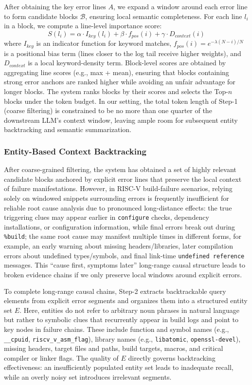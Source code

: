 \documentclass[sigconf]{acmart}
\begin{document}
After obtaining the key error lines $A$, we expand a window around each error line to form candidate blocks $\mathcal{B}$, ensuring local semantic completeness. For each line $l_i$ in a block, we compute a line-level importance score:
\begin{equation}
S(l_i) = \alpha \cdot I_{key}(l_i) + \beta \cdot f_{pos}(i) + \gamma \cdot D_{context}(i)
\end{equation}
where $I_{key}$ is an indicator function for keyword matches, $f_{pos}(i) = e^{-\lambda(N-i)/N}$ is a positional bias term (lines closer to the log tail receive higher weights), and $D_{context}$ is a local keyword-density term. Block-level scores are obtained by aggregating line scores (e.g., max + mean), ensuring that blocks containing strong error anchors are ranked higher while avoiding an unfair advantage for longer blocks. The system ranks blocks by their scores and selects the Top-$n$ blocks under the token budget. In our setting, the total token length of Step-1 (coarse filtering) is constrained to be no more than one quarter of the downstream LLM's context window, leaving ample room for subsequent entity backtracking and semantic summarization.

\subsubsection{Entity-Based Context Backtracking}

After coarse-grained filtering, the system has obtained a set of highly relevant candidate blocks anchored by explicit error lines that preserve the local context of failure manifestations. However, in RISC-V build-failure scenarios, relying solely on windowed snippets surrounding errors is frequently insufficient for reliable root cause analysis due to pronounced long-distance effects: the true triggering clues may appear earlier in \texttt{configure} checks, dependency installations, or configuration information, while final errors break out during \texttt{\%build}; the same root cause may manifest multiple times in different forms, for example, an early warning about missing headers/libraries, later compilation errors about undefined types/symbols, and final link-time \texttt{undefined reference} messages. This ``cause first, symptoms later'' long-range causal structure leads to broken evidence chains if we only preserve local windows around explicit errors.

To complete long-range causal chains, Step-2 extracts backtrackable query elements from explicit error segments and organizes them into a structured entity set $E$. Here, entities do not refer to arbitrary noun phrases in natural language but rather to symbolic clues that recurrently appear in build logs and point to key nodes in failure chains. These include function and symbol names (e.g., \texttt{\_\_cpuid}, \texttt{riscv\_v\_asm\_flag}), library names (e.g., \texttt{libatomic}, \texttt{openssl-devel}), missing headers, target files and paths, build targets, macros, and critical compiler or linker flags. The quality of $E$ directly governs backtracking effectiveness: an insufficiently populated entity set leads to inadequate recall, while an overly noisy set introduces irrelevant segments.
\end{document}

